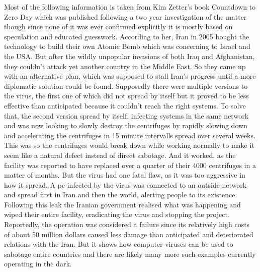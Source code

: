 \documentclass{article}
\begin{document}
	Most of the following information is taken from Kim Zetter's book Countdown to Zero Day which was published following a two year investigation of the matter though since none of it was ever confirmed explicitly it is mostly based on speculation and educated guesswork.
	According to her, Iran in 2005 bought the technology to build their own Atomic Bomb which was concerning to Israel and the USA. But after the wildly unpopular invasions of both Iraq and Afghanistan, they couldn't attack yet another country in the Middle East. So they came up with an alternative plan, which was supposed to stall Iran's progress until a more diplomatic solution could be found.
	Supposedly there were multiple versions to the virus, the first one of which did not spread by itself but it proved to be less effective than anticipated because it couldn't reach the right systems. To solve that, the second version spread by itself, infecting systems in the same network and was now looking to slowly destroy the centrifuges by rapidly slowing down and accelerating the centrifuges in 15 minute intervalls spread over several weeks. This was so the centrifuges would break down while working normally to make it seem like a natural defect instead of direct sabotage. And it worked, as the facility was reported to have replaced over a quarter of their 4000 centrifuges in a matter of months. But the virus had one fatal flaw, as it was too aggressive in how it spread. A pc infected by the virus was connected to an outside network and spread first in Iran and then the world, alerting people to its existence. Following this leak the Iranian government realised what was happening and wiped their entire facility, eradicating the virus and stopping the project. Reportedly, the operation was considered a failure since its relatively high costs of about 50 million dollars caused less damage than anticipated and deteriorated relations with the Iran. But it shows how computer viruses can be used to sabotage entire countries and there are likely many more such examples currently operating in the dark.























  
\end{document}
